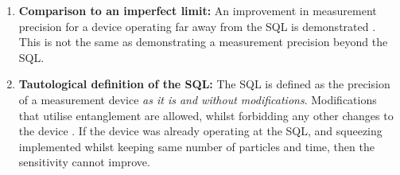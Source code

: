\documentclass[reqno]{amsart}
\begin{document}
\begin{enumerate}
\item \textbf{Comparison to an imperfect limit:} An improvement in measurement precision for a device operating far away from the SQL is demonstrated \cite{Aasi2013, Taylor2013, Tse2019, Casacio2021}. This is not the same as demonstrating a measurement precision beyond the SQL. %

\item \textbf{Tautological definition of the SQL:} The SQL is defined as the precision of a measurement device \emph{as it is and without modifications}. Modifications that utilise entanglement are allowed, whilst forbidding any other changes to the device \cite{Wu1986, Xiao1987}. If the device was already operating at the SQL, and squeezing implemented whilst keeping same number of particles and time, then the sensitivity cannot improve.%


\end{enumerate}
\end{document}
